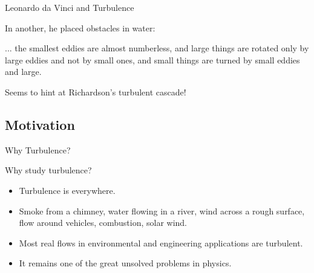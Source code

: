
\begin{frame}{Leonardo da Vinci and Turbulence}
  \setlength{\fboxsep}{0pt}
  \setlength{\fboxrule}{1pt}
  \begin{figure}[H]
  \centering
  \end{figure}
  
  In another, he placed obstacles in water:
      \begin{fancyquotes}
      ... the smallest eddies are almost numberless, and large things are rotated only by large eddies and not by small ones, and small things are turned by small eddies and large.	
      \end{fancyquotes}
Seems to hint at Richardson's turbulent cascade!
\end{frame}

\subsection{Motivation}
\begin{frame}{Why Turbulence?}

Why study turbulence?

\begin{itemize}
\item Turbulence is everywhere.
\item Smoke from a chimney, water flowing in a river, wind across a rough surface, flow around vehicles, combustion, solar wind.
\item Most real flows in environmental and engineering applications are turbulent. 
\item It remains one of the great unsolved problems in physics.
\end{itemize}

\end{frame}


